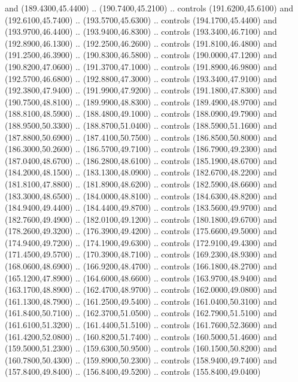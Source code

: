 {\begin{scope}[y=0.80pt, x=0.80pt, yscale=-1, xscale=1, inner sep=0pt, outer sep=0pt, #1]
      and (189.4300,45.4400) .. (190.7400,45.2100) .. controls (191.6200,45.6100)
      and (192.6100,45.7400) .. (193.5700,45.6300) .. controls (194.1700,45.4400)
      and (193.9700,46.4400) .. (193.9400,46.8300) .. controls (193.3400,46.7100)
      and (192.8900,46.1300) .. (192.2500,46.2600) .. controls (191.8100,46.4800)
      and (191.2500,46.3900) .. (190.8300,46.5800) .. controls (190.0000,47.1200)
      and (190.8200,47.0600) .. (191.3700,47.1000) .. controls (191.8900,46.9800)
      and (192.5700,46.6800) .. (192.8800,47.3000) .. controls (193.3400,47.9100)
      and (192.3800,47.9400) .. (191.9900,47.9200) .. controls (191.1800,47.8300)
      and (190.7500,48.8100) .. (189.9900,48.8300) .. controls (189.4900,48.9700)
      and (188.8100,48.5900) .. (188.4800,49.1000) .. controls (188.0900,49.7900)
      and (188.9500,50.3300) .. (188.8700,51.0400) .. controls (188.5900,51.1600)
      and (187.8800,50.6900) .. (187.4100,50.7500) .. controls (186.8500,50.8000)
      and (186.3000,50.2600) .. (186.5700,49.7100) .. controls (186.7900,49.2300)
      and (187.0400,48.6700) .. (186.2800,48.6100) .. controls (185.1900,48.6700)
      and (184.2000,48.1500) .. (183.1300,48.0900) .. controls (182.6700,48.2200)
      and (181.8100,47.8800) .. (181.8900,48.6200) .. controls (182.5900,48.6600)
      and (183.3000,48.6500) .. (184.0000,48.8100) .. controls (184.6300,48.8200)
      and (184.9400,49.4400) .. (184.4400,49.8700) .. controls (183.5600,49.9700)
      and (182.7600,49.4900) .. (182.0100,49.1200) .. controls (180.1800,49.6700)
      and (178.2600,49.3200) .. (176.3900,49.4200) .. controls (175.6600,49.5000)
      and (174.9400,49.7200) .. (174.1900,49.6300) .. controls (172.9100,49.4300)
      and (171.4500,49.5700) .. (170.3900,48.7100) .. controls (169.2300,48.9300)
      and (168.0600,48.6900) .. (166.9200,48.4700) .. controls (166.1800,48.2700)
      and (165.1200,47.8900) .. (164.6000,48.6600) .. controls (163.9700,48.9400)
      and (163.1700,48.8900) .. (162.4700,48.9700) .. controls (162.0000,49.0800)
      and (161.1300,48.7900) .. (161.2500,49.5400) .. controls (161.0400,50.3100)
      and (161.8400,50.7100) .. (162.3700,51.0500) .. controls (162.7900,51.5100)
      and (161.6100,51.3200) .. (161.4400,51.5100) .. controls (161.7600,52.3600)
      and (161.4200,52.0800) .. (160.8200,51.7400) .. controls (160.5000,51.4600)
      and (159.5000,51.2300) .. (159.6300,50.9500) .. controls (160.1500,50.8200)
      and (160.7800,50.4300) .. (159.8900,50.2300) .. controls (158.9400,49.7400)
      and (157.8400,49.8400) .. (156.8400,49.5200) .. controls (155.8400,49.0400)

\end{scope}}
